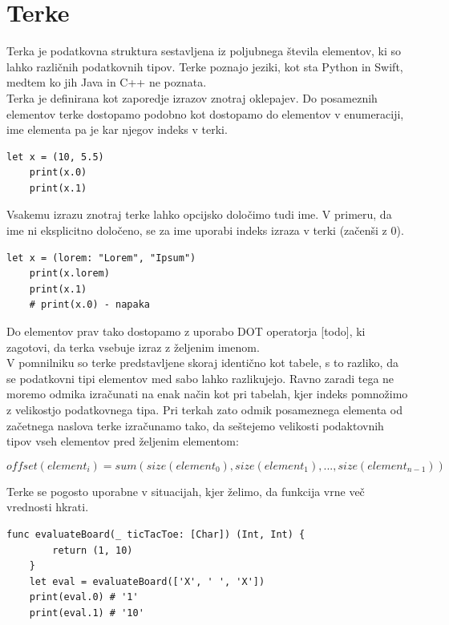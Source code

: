 \documentclass[a4paper, 12p]{book}
\begin{document}
\section{Terke}

Terka je podatkovna struktura sestavljena iz poljubnega števila elementov, ki so lahko različnih podatkovnih tipov. Terke poznajo jeziki, kot sta Python in Swift, medtem ko jih Java in C++ ne poznata.\\
\indent Terka je definirana kot zaporedje izrazov znotraj oklepajev. Do posameznih elementov terke dostopamo podobno kot dostopamo do elementov v enumeraciji, ime elementa pa je kar njegov indeks v terki. 

\begin{lstlisting}[caption={Terka, sestavljena iz dveh vrednosti (Int, Double).}, captionpos=b]
	let x = (10, 5.5)
	print(x.0)
	print(x.1)
\end{lstlisting}

Vsakemu izrazu znotraj terke lahko opcijsko določimo tudi ime. V primeru, da ime ni eksplicitno določeno, se za ime uporabi indeks izraza v terki (začenši z 0).

\begin{lstlisting}[caption={Terka s poimenovanim elementom.}, captionpos=b]
	let x = (lorem: "Lorem", "Ipsum")
	print(x.lorem)
	print(x.1)
	# print(x.0) - napaka
\end{lstlisting}

\indent Do elementov prav tako dostopamo z uporabo DOT operatorja [todo], ki zagotovi, da terka vsebuje izraz z željenim imenom.\\
\indent V pomnilniku so terke predstavljene skoraj identično kot tabele, s to razliko, da se podatkovni tipi elementov med sabo lahko razlikujejo. Ravno zaradi tega ne moremo odmika izračunati na enak način kot pri tabelah, kjer indeks pomnožimo z velikostjo podatkovnega tipa. Pri terkah zato odmik posameznega elementa od začetnega naslova terke izračunamo tako, da seštejemo velikosti podaktovnih tipov vseh elementov pred željenim elementom:

\vspace{-7mm}
\[ offset ( element_i )  = sum ( size ( element_0 ), size( element_1 ), ..., size ( element_{n-1})) \]

Terke se pogosto uporabne v situacijah, kjer želimo, da funkcija vrne več vrednosti hkrati.

\begin{lstlisting}[caption={Funkcija, ki vrača dve vrednosti hkrati.}, captionpos=b]
	func evaluateBoard(_ ticTacToe: [Char]) (Int, Int) {
	    return (1, 10)
	}
	let eval = evaluateBoard(['X', ' ', 'X'])
	print(eval.0) # '1'
	print(eval.1) # '10'
\end{lstlisting}
\end{document}
